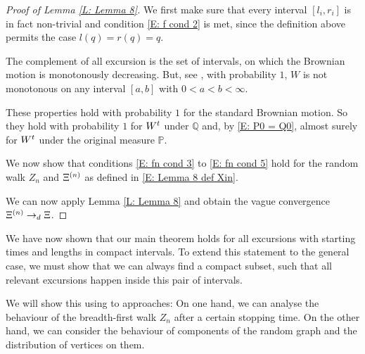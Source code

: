 \begin{proof}[Proof of Lemma \ref{L: Lemma 8}]
	We first make sure that every interval $[l_i, r_i]$ is in fact non-trivial and condition \ref{E: f cond 2} is met,
	since the definition above permits the case $l(q) = r(q) = q$.
	
	The complement of all excursion is the set of intervals,
	on which the Brownian motion is monotonously decreasing.
	But, see \cite[Theorem 1.22]{Peres2008}, with probability $1$,
	$W$ is not monotonous on any interval $[a,b]$ with $0 < a < b < \infty$.
	
	These properties hold with probability $1$ for the standard Brownian motion.
	So they hold with probability $1$ for $W^t$ under $\mathbb{Q}$
	and, by \eqref{E: P0 = Q0}, 
	almost surely for $W^t$ under the original measure $\mathbb{P}$.
	
	
	We now show that conditions 
	\eqref{E: fn cond 3} to \eqref{E: fn cond 5}
	hold for the random walk $Z_n$ and $\Xi^{(n)}$
	as defined in \eqref{E: Lemma 8 def Xin}.
	


	We can now apply Lemma \ref{L: Lemma 8} and obtain the vague convergence
	$ \Xi^{(n)} \rightarrow_d \Xi $.
\end{proof}


We have now shown that our main theorem holds for all excursions
with starting times and lengths in compact intervals.
To extend this statement to the general case,
we must show that we can always find a compact subset,
such that all relevant excursions happen inside this pair of intervals.

We will show this using to approaches:
On one hand, we can analyse the behaviour of the breadth-first walk $Z_n$
after a certain stopping time.
On the other hand, 
we can consider the behaviour of components of the random graph
and the distribution of vertices on them.

